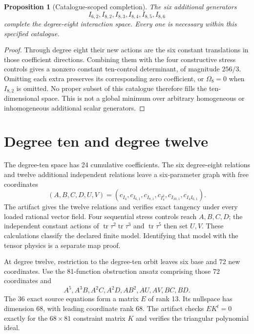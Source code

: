 \documentclass[11pt]{article}
\newtheorem{proposition}[theorem]{Proposition}
\newcommand{\tr}{\operatorname{tr}}
\begin{document}
\begin{proposition}[Catalogue-scoped completion]
The six additional generators
\[I_{6,2},I_{8,2},I_{8,3},I_{8,4},I_{8,5},I_{8,6}\]
complete the degree-eight
interaction space. Every one is necessary within this specified catalogue.
\end{proposition}
\begin{proof}
Through degree eight their new actions are the six constant translations in
those coefficient directions. Combining them with the four constructive
stress controls gives a nonzero constant ten-control determinant, of magnitude
$256/3$. Omitting each extra preserves its corresponding zero coefficient,
or $\Omega_8=0$ when $I_{8,2}$ is omitted. No proper subset of this catalogue
therefore fills the ten-dimensional space. This is not a global minimum over
arbitrary homogeneous or inhomogeneous additional scalar generators.
\end{proof}

\section{Degree ten and degree twelve}
The degree-ten space has 24 cumulative coefficients. The six degree-eight
relations and twelve additional independent relations leave a six-parameter
graph with free coordinates
\begin{equation}
 (A,B,C,D,U,V)=(c_{I_4},c_{I_{6,1}},c_{I_{8,1}},c_{I_4^2},c_{I_{10,1}},c_{I_4I_{6,1}}).
\end{equation}
The artifact gives the twelve relations and verifies exact tangency under every
loaded rational vector field. Four sequential stress controls reach $A,B,C,D$;
the independent constant actions of $\tr\tau^2\tr\tau^3$ and $\tr\tau^5$
then set $U,V$. These calculations classify the declared finite model.
Identifying that model with the tensor physics is a separate map proof.

At degree twelve, restriction to the degree-ten orbit leaves six base and 72
new coordinates. Use the 81-function obstruction ansatz comprising those
72 coordinates and
\begin{equation}
 A^5,A^3B,A^2C,A^2D,AB^2,AU,AV,BC,BD.
\end{equation}
The 36 exact source equations form a matrix $E$ of rank 13. Its nullspace has
dimension 68, with leading coordinate rank 68. The artifact checks $EK^t=0$
exactly for the $68\times81$ constraint matrix $K$ and verifies the triangular
polynomial ideal.
\end{document}
